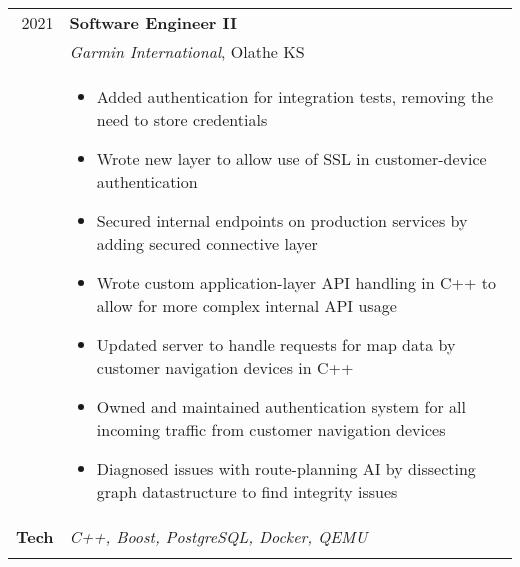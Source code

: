 \documentclass[a4paper,10pt]{article}
\newcommand{\br}{\\\multicolumn{2}{c}{}}
\begin{document}
\begin{tabular}{r p{15cm}}
  \textsc{2021}  & \textbf{Software Engineer II} \\
                 & \textit{Garmin International}, Olathe KS
  \\ &
       \begin{itemize}
       \item Added authentication for integration tests, removing the need to store credentials
       \item Wrote new layer to allow use of SSL in customer-device authentication
       \item Secured internal endpoints on production services by adding secured connective layer
       \item Wrote custom application-layer API handling in C++ to allow for more complex internal API usage
       \item Updated server to handle requests for map data by customer navigation devices in C++
       \item Owned and maintained authentication system for all incoming traffic from customer navigation devices
       \item Diagnosed issues with route-planning AI by dissecting graph datastructure to find integrity issues
       \end{itemize} \\
  \textbf{Tech} & \textit{C++, Boost, PostgreSQL, Docker, QEMU} \br \\
\end{tabular}
\end{document}
